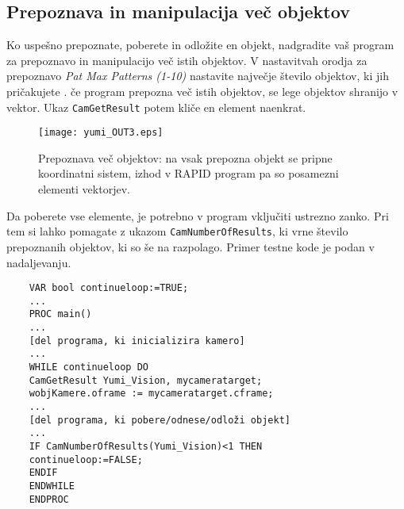 \subsection{Prepoznava in manipulacija več objektov}

Ko uspešno prepoznate, poberete in odložite en objekt, nadgradite vaš program za prepoznavo in manipulacijo več istih objektov. V nastavitvah orodja za prepoznavo \emph{Pat Max Patterns (1-10)} nastavite največje število objektov, ki jih pričakujete . če program prepozna več istih objektov, se lege objektov shranijo v vektor. Ukaz \verb"CamGetResult" potem kliče en element naenkrat.


\begin{figure}[!hbt]
	\centering
	\texttt{[image: yumi\_OUT3.eps]}
	\caption{Prepoznava več objektov: na vsak prepozna objekt se pripne koordinatni sistem, izhod v RAPID program pa so posamezni elementi vektorjev.}
	\label{fig:yumi_vision}
\end{figure}


Da poberete vse elemente, je potrebno v program vključiti ustrezno zanko. Pri tem si lahko pomagate z ukazom \verb"CamNumberOfResults", ki vrne število prepoznanih objektov, ki so še na razpolago. Primer testne kode je podan v nadaljevanju.




\begin{verbatim}
	VAR bool continueloop:=TRUE;
	...
	PROC main()
	...
	[del programa, ki inicializira kamero]
	...
	WHILE continueloop DO
	CamGetResult Yumi_Vision, mycameratarget;
	wobjKamere.oframe := mycameratarget.cframe;
	...
	[del programa, ki pobere/odnese/odloži objekt]
	...
	IF CamNumberOfResults(Yumi_Vision)<1 THEN
	continueloop:=FALSE;
	ENDIF
	ENDWHILE
	ENDPROC
\end{verbatim}


